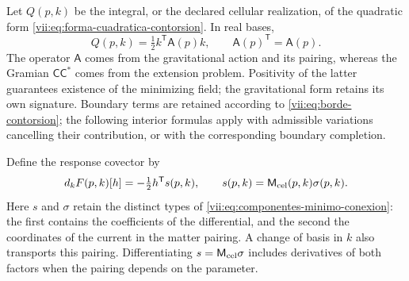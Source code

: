 Let \(Q(p,k)\) be the integral, or the declared cellular
realization, of the quadratic form
\eqref{vii:eq:forma-cuadratica-contorsion}. In real bases,
\begin{equation}
 Q(p,k)=\tfrac12 k^{\mathsf T}\mathsf A(p)k,
 \qquad \mathsf A(p)^{\mathsf T}=\mathsf A(p).
 \label{vii:eq:cuadratica-celular-contorsion}
\end{equation}
The operator \(\mathsf A\) comes from the gravitational action
and its pairing, whereas the Gramian
\(\mathsf C\mathsf C^*\) comes from the extension problem.
Positivity of the latter guarantees existence of the minimizing field;
the gravitational form retains its own signature. Boundary terms are
retained according to \eqref{vii:eq:borde-contorsion}; the following
interior formulas apply with admissible variations cancelling their
contribution, or with the corresponding boundary completion.

Define the response covector by
\begin{equation}
 d_kF(p,k)[h]= -\tfrac12 h^{\mathsf T}s(p,k),
 \qquad s(p,k)=\mathsf M_{\rm cel}(p,k)\sigma(p,k).
 \label{vii:eq:covector-torsional-minimo}
\end{equation}
Here \(s\) and \(\sigma\) retain the distinct types of
\eqref{vii:eq:componentes-minimo-conexion}: the first contains the
coefficients of the differential, and the second the coordinates of
the current in the matter pairing. A change of basis in
\(k\) also transports this pairing. Differentiating
\(s=\mathsf M_{\rm cel}\sigma\) includes derivatives of both
factors when the pairing depends on the parameter.

